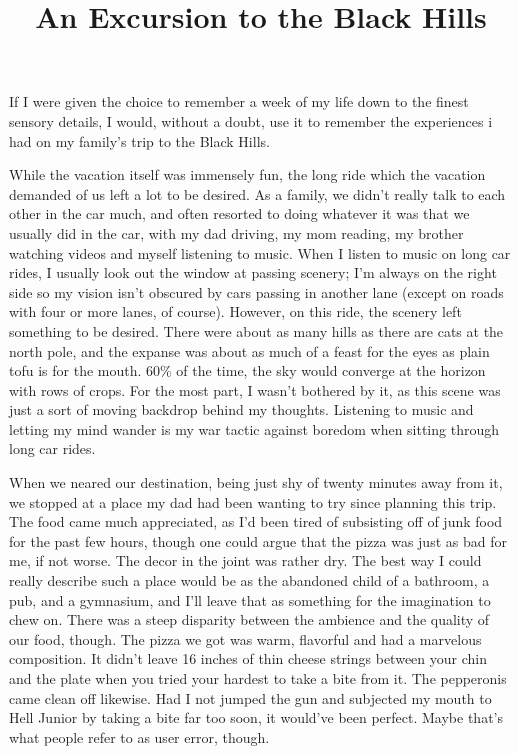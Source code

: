 \documentclass[12pt]{article}
\title{An Excursion to the Black Hills}
\begin{document}
\makeheader
If I were given the choice to remember a week of my life down to the finest sensory details, I would, without a doubt, use it to remember the experiences i had on my family's trip to the Black Hills.

While the vacation itself was immensely fun, the long ride which the vacation demanded of us left a lot to be desired.  As a family, we didn't really talk to each other in the car much, and often resorted to doing whatever it was that we usually did in the car, with my dad driving, my mom reading, my brother watching videos and myself listening to music.  When I listen to music on long car rides, I usually look out the window at passing scenery;  I'm always on the right side so my vision isn't obscured by cars passing in another lane (except on roads with four or more lanes, of course).  However, on this ride, the scenery left something to be desired.  There were about as many hills as there are cats at the north pole, and the expanse was about as much of a feast for the eyes as plain tofu is for the mouth.  60\% of the time, the sky would converge at the horizon with rows of crops.  For the most part, I wasn't bothered by it, as this scene was just a sort of moving backdrop behind my thoughts.  Listening to music and letting my mind wander is my war tactic against boredom when sitting through long car rides.

When we neared our destination, being just shy of twenty minutes away from it, we stopped at a place my dad had been wanting to try since planning this trip.  The food came much appreciated, as I'd been tired of subsisting off of junk food for the past few hours, though one could argue that the pizza was just as bad for me, if not worse.  The decor in the joint was rather dry.  The best way I could really describe such a place would be as the abandoned child of a bathroom, a pub, and a gymnasium, and I'll leave that as something for the imagination to chew on.  There was a steep disparity between the ambience and the quality of our food, though.  The pizza we got was warm, flavorful and had a marvelous composition.  It didn't leave 16 inches of thin cheese strings between your chin and the plate when you tried your hardest to take a bite from it.  The pepperonis came clean off likewise.  Had I not jumped the gun and subjected my mouth to Hell Junior by taking a bite far too soon, it would've been perfect.  Maybe that's what people refer to as user error, though.
\end{document}
